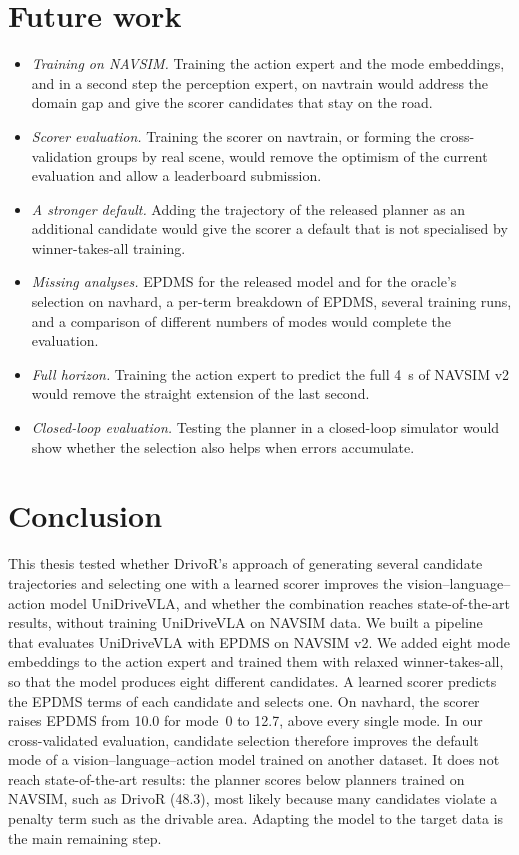 \documentclass[11pt, a4paper, oneside]{book}
\begin{document}
\section{Future work}
\label{sec:future}
\begin{itemize}
  \item \emph{Training on NAVSIM.} Training the action expert and the mode embeddings, and in a
  second step the perception expert, on navtrain would address the domain gap and give the
  scorer candidates that stay on the road.
  \item \emph{Scorer evaluation.} Training the scorer on navtrain, or forming the
  cross-validation groups by real scene, would remove the optimism of the current evaluation and
  allow a leaderboard submission.
  \item \emph{A stronger default.} Adding the trajectory of the released planner as an
  additional candidate would give the scorer a default that is not specialised by
  winner-takes-all training.
  \item \emph{Missing analyses.} EPDMS for the released model and for the oracle's selection
  on navhard, a per-term breakdown of EPDMS, several training runs, and a comparison of
  different numbers of modes would complete the evaluation.
  \item \emph{Full horizon.} Training the action expert to predict the full \SI{4}{\second}
  of NAVSIM v2 would remove the straight extension of the last second.
  \item \emph{Closed-loop evaluation.} Testing the planner in a closed-loop simulator would show
  whether the selection also helps when errors accumulate.
\end{itemize}

\section{Conclusion}
\label{sec:conclusion}
This thesis tested whether DrivoR's approach of generating several candidate trajectories and
selecting one with a learned scorer improves the vision--language--action model UniDriveVLA,
and whether the combination reaches state-of-the-art results, without training UniDriveVLA on
NAVSIM data. We built a pipeline that evaluates
UniDriveVLA with EPDMS on NAVSIM v2. We added eight mode embeddings to the action expert and
trained them with relaxed winner-takes-all, so that the model produces eight different
candidates. A learned scorer predicts the EPDMS terms of each candidate and selects one. On
navhard, the scorer raises EPDMS from \num{10.0} for mode~0 to \num{12.7}, above every single
mode. In our cross-validated evaluation, candidate selection therefore improves the default
mode of a vision--language--action model trained on another dataset. It does not reach
state-of-the-art results: the planner scores below planners trained on NAVSIM, such as DrivoR
(\num{48.3}), most likely because many candidates violate a penalty term such as the drivable
area. Adapting the model to the target data is the main remaining step.

\backmatter



\end{document}
